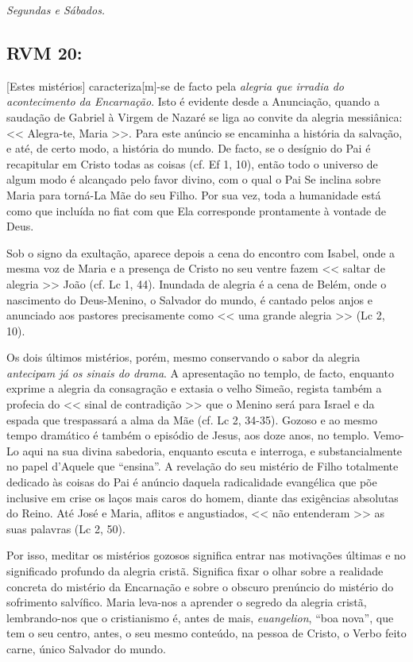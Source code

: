 \documentclass[10pt,a5paper]{book}
\newcommand{\from}[1]{\subsection*{#1}}
\begin{document}
\emph{Segundas e Sábados.}

\from{RVM 20:}

[Estes mistérios] caracteriza[m]-se de facto pela \emph{alegria que irradia do acontecimento da Encarnação}.
Isto é evidente desde a Anunciação, quando a saudação de Gabriel à Virgem de Nazaré se liga ao convite da alegria messiânica:
<< Alegra-te, Maria >>.
Para este anúncio se encaminha a história da salvação, e até, de certo modo, a história do mundo.
De facto, se o desígnio do Pai é recapitular em Cristo todas as coisas (cf. Ef 1, 10), então todo o
universo de algum modo é alcançado pelo favor divino, com o qual o Pai Se inclina sobre Maria
para torná-La Mãe do seu Filho.
Por sua vez, toda a humanidade está como que incluída no fiat com que Ela corresponde prontamente à vontade de Deus.

Sob o signo da exultação, aparece depois a cena do encontro com Isabel, onde a mesma voz de Maria e a presença de Cristo no seu ventre fazem << saltar de alegria >> João (cf. Lc 1, 44).
Inundada de alegria é a cena de Belém, onde o nascimento do Deus-Menino, o Salvador do mundo, é cantado pelos anjos e anunciado aos pastores precisamente como << uma grande alegria >> (Lc 2, 10).

Os dois últimos mistérios, porém, mesmo conservando o sabor da alegria \emph{antecipam já os sinais do drama}.
A apresentação no templo, de facto, enquanto exprime a alegria da consagração e extasia o velho Simeão, regista também a profecia do << sinal de contradição >> que o Menino será para Israel e da espada que trespassará a alma da Mãe (cf. Lc 2, 34-35).
Gozoso e ao mesmo tempo dramático é também o episódio de Jesus, aos doze anos, no templo.
Vemo-Lo aqui na sua divina sabedoria, enquanto escuta e interroga, e substancialmente no papel d'Aquele que ``ensina''.
A revelação do seu mistério de Filho totalmente dedicado às coisas do Pai é anúncio daquela radicalidade evangélica que põe inclusive em crise os laços mais caros do homem, diante das exigências absolutas do Reino.
Até José e Maria, aflitos e angustiados, << não entenderam >> as suas palavras (Lc 2, 50).

Por isso, meditar os mistérios gozosos significa entrar nas motivações últimas e no significado profundo da alegria cristã. Significa fixar o olhar sobre a realidade concreta do mistério da Encarnação e sobre o obscuro prenúncio do mistério do sofrimento salvífico.
Maria leva-nos a aprender o segredo da alegria cristã, lembrando-nos que o cristianismo é, antes de mais, \emph{euangelion}, ``boa nova'', que tem o seu centro, antes, o seu mesmo conteúdo, na pessoa de Cristo, o Verbo feito carne, único Salvador do mundo.
\end{document}
